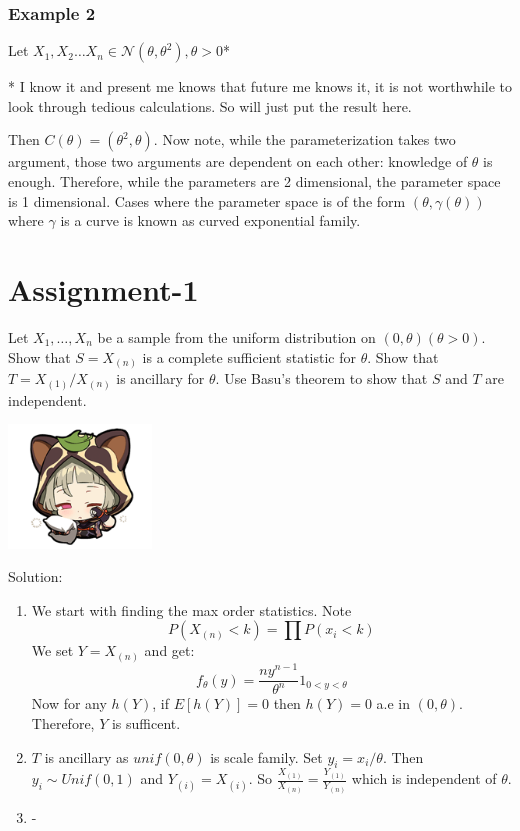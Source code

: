 \documentclass[oneside]{book}
\begin{document}
\subsection{Example 2}
Let $X_1,X_2\hdots X_n\in\mathcal N(\theta,\theta^2),\theta>0$*\
\begin{marginfigure}
    * I know it and present me knows that future me knows it, it is not worthwhile to look through tedious calculations. So will just put the result here. 
\end{marginfigure}
Then $C(\theta)=(\theta^2,\theta)$. Now note, while the parameterization takes two argument, those two arguments are dependent on each other: knowledge of $\theta$ is enough. Therefore, while the parameters are 2 dimensional, the parameter space is 1 dimensional. Cases where the parameter space is of the form $(\theta,\gamma(\theta))$ where $\gamma$ is a curve is known as curved exponential family. 
\chapter{Assignment-1}

\setmainfont{CMU Serif}
\begin{tcolorbox}[colback=bgcol,colframe=bodercol,title=Problem 1]
    Let $X_{1}, \ldots, X_{n}$ be a sample from the uniform distribution on $(0, \theta)(\theta>0)$. Show that $S=X_{(n)}$ is a complete sufficient statistic for $\theta$. Show that $T=X_{(1)} / X_{(n)}$ is ancillary for $\theta$. Use Basu's theorem to show that $S$ and $T$ are independent.
\end{tcolorbox}
\setmainfont{Indie Flower}
\begin{marginfigure}%
    \includegraphics[width=1.5in]{chibis/file_025.png}
\end{marginfigure}%
Solution:\\
\begin{enumerate}
    \item We start with finding the max order statistics. Note 
    $$P\left(X_{(n)}<k\right)=\prod P(x_i<k)$$
    We set $Y=X_{(n)}$ and get:
    $$f_\theta(y)=\frac{ny^{n-1}}{\theta^n}1_{0<y<\theta}$$
    Now for any $h(Y)$, if $E[h(Y)]=0$ then $h(Y)=0$ a.e in $(0,\theta)$. Therefore, $Y$ is sufficent.
    \item $T$ is ancillary as $unif(0,\theta)$ is scale family. Set $y_i=x_i/\theta$. Then $y_i\sim Unif(0,1)$ and $Y_{(i)}=X_{(i)}$. So $\frac{X_{(1)}}{X_(n)}=\frac{Y_{(1)}}{Y_(n)}$ which is independent of $\theta$. 
    \item -
\end{enumerate}
\end{document}
